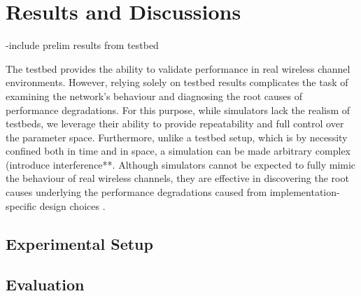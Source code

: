 \chapter{Results and Discussions}
\label{results}

-include prelim results from testbed

The testbed provides the ability to validate performance in real wireless channel environments. However, relying solely on testbed results complicates the task of examining the network's behaviour and diagnosing the root causes of performance degradations. For this purpose, while simulators lack the realism of testbeds, we leverage their ability to provide repeatability and full control over the parameter space. Furthermore, unlike a testbed setup, which is by necessity confined both in time and in space, a simulation can be made arbitrary complex (introduce interference**. Although simulators cannot be expected to fully mimic the behaviour of real wireless channels, they are effective in discovering the root causes underlying the performance degradations caused from implementation-specific design choices \cite{beyondInteroperability}.

\section{Experimental Setup}

\section{Evaluation}